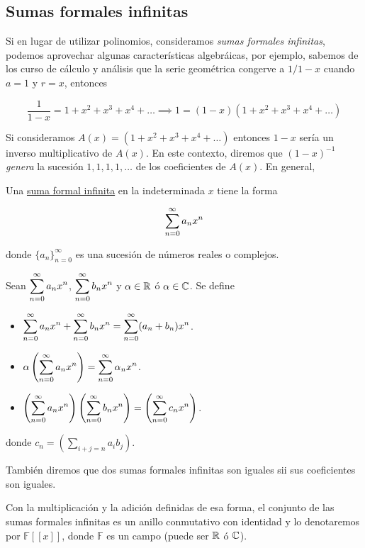 \subsection{Sumas formales infinitas}

Si en lugar de utilizar polinomios, consideramos \textit{sumas formales infinitas}, podemos aprovechar algunas características algebráicas, por ejemplo, sabemos de los curso de cálculo y análisis que la serie geométrica congerve a $1/1-x$ cuando $a = 1$ y $r = x$, entonces

\[
\frac{1}{1-x} = 1 + x^2 + x^3 + x^4 + \dots \implies 1 = (1-x)(1 + x^2 + x^3 + x^4 + \dots)
\]

Si consideramos $A(x) = (1 + x^2 + x^3 + x^4 + \dots)$ entonces $1-x$ sería un inverso multiplicativo de $A(x)$. En este contexto, diremos que $(1-x)^{-1}$ \textit{genera} la sucesión $1, 1, 1, 1, \dots$ de los coeficientes de $A(x)$. En general,

\begin{defn}
    Una \ul{suma formal infinita} en la indeterminada $x$ tiene la forma
    
    \[
    \sum_{n=0}^{\infty} a_nx^n
    \]
    
    \noindent donde $\{a_n\}_{n=0}^{\infty}$ es una sucesión de números reales o complejos.
    
    Sean $\displaystyle \sum_{n=0}^{\infty} a_nx^n$, $\displaystyle \sum_{n=0}^{\infty} b_nx^n$ y $\alpha \in \mathbb{R}$ ó $\alpha \in \mathbb{C}$. Se define
    
    \begin{itemize}
        \item $\displaystyle \sum_{n=0}^{\infty} a_nx^n + \sum_{n=0}^{\infty} b_nx^n = \sum_{n=0}^{\infty} (a_n + b_n)x^n$.
        \item $\displaystyle \alpha \left( \sum_{n=0}^{\infty} a_nx^n \right) = \sum_{n=0}^{\infty} \alpha_nx^n$.
        \item $\displaystyle \left( \sum_{n=0}^{\infty} a_nx^n \right)\left( \sum_{n=0}^{\infty} b_nx^n \right) = \left( \sum_{n=0}^{\infty} c_nx^n \right)$.
    \end{itemize}
    
    \noindent donde $\displaystyle c_n = \left( \sum_{i+j=n} a_ib_j \right)$.
    
    También diremos que dos sumas formales infinitas son iguales sii sus coeficientes son iguales.
\end{defn}

Con la multiplicación y la adición definidas de esa forma, el conjunto de las sumas formales infinitas es un anillo conmutativo con identidad y lo denotaremos por $\mathbb{F}[[x]]$, donde $\mathbb{F}$ es un campo (puede ser $\mathbb{R}$ ó $\mathbb{C}$).

